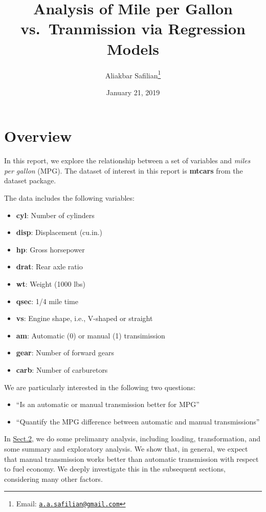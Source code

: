 \documentclass[]{article}
\title{Analysis of Mile per Gallon vs.~Tranmission via Regression Models}
\author{Aliakbar Safilian\footnote{Email:
  \href{mailto:a.a.safilian@gmail.com}{\nolinkurl{a.a.safilian@gmail.com}}}}
\date{January 21, 2019}
\providecommand{\tightlist}{%
  \setlength{\itemsep}{0pt}\setlength{\parskip}{0pt}}
\begin{document}
\maketitle

{
\hypersetup{linkcolor=black}
\setcounter{tocdepth}{2}
\tableofcontents
}
\newtheorem{theorem}{Theorem} \newtheorem{lemma}{Lemma}

\section{Overview}\label{overview}

In this report, we explore the relationship between a set of variables
and \emph{miles per gallon} (MPG). The dataset of interest in this
report is \textbf{mtcars} from the dataset package.

The data includes the following variables:

\begin{itemize}
\tightlist
\item
  \textbf{cyl}: Number of cylinders
\item
  \textbf{disp}: Displacement (cu.in.)
\item
  \textbf{hp}: Gross horsepower
\item
  \textbf{drat}: Rear axle ratio
\item
  \textbf{wt}: Weight (1000 lbs)
\item
  \textbf{qsec}: 1/4 mile time
\item
  \textbf{vs}: Engine shape, i.e., V-shaped or straight
\item
  \textbf{am}: Automatic (0) or manual (1) transimission
\item
  \textbf{gear}: Number of forward gears
\item
  \textbf{carb}: Number of carburetors
\end{itemize}

We are particularly interested in the following two questions:

\begin{itemize}
\tightlist
\item
  ``Is an automatic or manual transmission better for MPG''
\item
  ``Quantify the MPG difference between automatic and manual
  transmissions''
\end{itemize}

In \protect\hyperlink{sec-prelim}{Sect.2}, we do some prelimanry
analysis, including loading, transformation, and some summary and
exploratory analysis. We show that, in general, we expect that manual
transmission works better than automatic transmission with respect to
fuel economy. We deeply investigate this in the subsequent sections,
considering many other factors.
\end{document}
